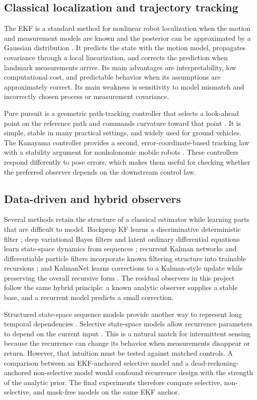 \documentclass[11pt]{article}
\begin{document}
\subsection{Classical localization and trajectory tracking}
The EKF is a standard method for nonlinear robot localization when the motion and measurement models are known and the posterior can be approximated by a Gaussian distribution \cite{thrun2005probabilistic}. It predicts the state with the motion model, propagates covariance through a local linearization, and corrects the prediction when landmark measurements arrive. Its main advantages are interpretability, low computational cost, and predictable behavior when its assumptions are approximately correct. Its main weakness is sensitivity to model mismatch and incorrectly chosen process or measurement covariance.

Pure pursuit is a geometric path-tracking controller that selects a look-ahead point on the reference path and commands curvature toward that point \cite{coulter1992pure}. It is simple, stable in many practical settings, and widely used for ground vehicles. The Kanayama controller provides a second, error-coordinate-based tracking law with a stability argument for nonholonomic mobile robots \cite{kanayama1990stable}. These controllers respond differently to pose errors, which makes them useful for checking whether the preferred observer depends on the downstream control law.

\subsection{Data-driven and hybrid observers}
Several methods retain the structure of a classical estimator while learning parts that are difficult to model. Backprop KF learns a discriminative deterministic filter \cite{ha2016backprop}; deep variational Bayes filters and latent ordinary differential equations learn state-space dynamics from sequences \cite{karl2017dvbf,rubanova2019latentode}; recurrent Kalman networks and differentiable particle filters incorporate known filtering structure into trainable recursions \cite{becker2019rkn,jonschkowski2018dpf}; and KalmanNet learns corrections to a Kalman-style update while preserving the overall recursive form \cite{revach2022kalmannet}. The residual observers in this project follow the same hybrid principle: a known analytic observer supplies a stable base, and a recurrent model predicts a small correction.

Structured state-space sequence models provide another way to represent long temporal dependencies \cite{gu2022s4}. Selective state-space models allow recurrence parameters to depend on the current input \cite{gu2024mamba}. This is a natural match for intermittent sensing because the recurrence can change its behavior when measurements disappear or return. However, that intuition must be tested against matched controls. A comparison between an EKF-anchored selective model and a dead-reckoning-anchored non-selective model would confound recurrence design with the strength of the analytic prior. The final experiments therefore compare selective, non-selective, and mask-free models on the same EKF anchor.
\end{document}
